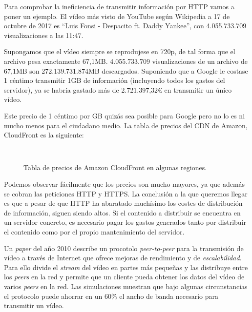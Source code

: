 \documentclass[12pt]{article} %
\begin{document}
Para comprobar la ineficiencia de transmitir información por HTTP vamos a poner un ejemplo. El vídeo más visto de YouTube según Wikipedia a 17 de octubre de 2017 es ``Luis Fonsi - Despacito ft. Daddy Yankee''\cite{most-viewed-yt}, con 4.055.733.709 visualizaciones a las 11:47.

Supongamos que el vídeo siempre se reprodujese en 720p, de tal forma que el archivo pesa exactamente 67,1MB. 4.055.733.709 visualizaciones de un archivo de 67,1MB son 272.139.731.874MB descargados. Suponiendo que a Google le costase 1 céntimo transmitir 1GB de información\cite{youtube-transmission-cost} (incluyendo todos los gastos del servidor), ya se habría gastado más de 2.721.397,32€ en transmitir un único vídeo.

Este precio de 1 céntimo por GB quizás sea posible para Google pero no lo es ni mucho menos para el ciudadano medio. La tabla de precios del CDN de Amazon, CloudFront es la siguiente\cite{cloudfront-prices}:

\begin{figure}[H]
	\centering
	\texttt{
	}
	\caption{Tabla de precios de Amazon CloudFront en algunas regiones.}
\end{figure}
\vspace{-.5cm}
Podemos observar fácilmente que los precios son mucho mayores, ya que además se cobran las peticiones HTTP y HTTPS. La conclusión a la que queremos llegar es que a pesar de que HTTP ha abaratado muchísimo los costes de distribución de información, siguen siendo altos. Si el contenido a distribuir se encuentra en un servidor concreto, es necesario pagar los gastos generados tanto por distribuir el contenido como por el propio mantenimiento del servidor.

Un \textit{paper} del año 2010\cite{p2p-vdn} describe un procotolo \textit{peer-to-peer} para la transmisión de vídeo a través de Internet que ofrece mejoras de rendimiento y de \textit{escalabilidad}. Para ello divide el \textit{stream} del vídeo en partes más pequeñas y las distribuye entre los \textit{peers} en la red y permite que un cliente pueda obtener los datos del vídeo de varios \textit{peers} en la red. Las simulaciones muestran que bajo algunas circunstancias el protocolo puede ahorrar en un 60\% el ancho de banda necesario para transmitir un vídeo.
\end{document}
